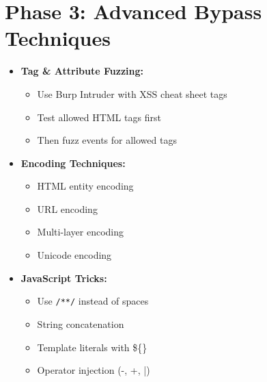 \documentclass[12pt]{article}
\begin{document}
\section{Phase 3: Advanced Bypass Techniques}

\begin{tcolorbox}[title={\textbf{3.1 WAF Bypass Strategies}}, colback=lightred]
\begin{itemize}[leftmargin=*]
    \item \textbf{Tag \& Attribute Fuzzing:}
    \begin{itemize}
        \item Use Burp Intruder with XSS cheat sheet tags
        \item Test allowed HTML tags first
        \item Then fuzz events for allowed tags
    \end{itemize}
    
    \item \textbf{Encoding Techniques:}
    \begin{itemize}
        \item HTML entity encoding
        \item URL encoding
        \item Multi-layer encoding
        \item Unicode encoding
    \end{itemize}
    
    \item \textbf{JavaScript Tricks:}
    \begin{itemize}
        \item Use \texttt{/**/} instead of spaces
        \item String concatenation
        \item Template literals with \$\{\}
        \item Operator injection (-, +, |)
    \end{itemize}
\end{itemize}
\end{tcolorbox}
\end{document}
